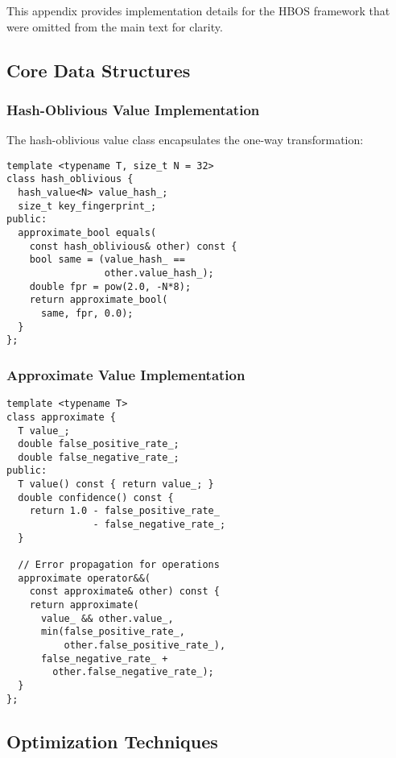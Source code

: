\documentclass[10pt,conference]{IEEEtran}
\begin{document}
This appendix provides implementation details for the HBOS framework that were omitted from the main text for clarity.

\subsection{Core Data Structures}

\subsubsection{Hash-Oblivious Value Implementation}

The hash-oblivious value class encapsulates the one-way transformation:

\begin{lstlisting}[caption={Hash-oblivious value implementation}]
template <typename T, size_t N = 32>
class hash_oblivious {
  hash_value<N> value_hash_;
  size_t key_fingerprint_;
public:
  approximate_bool equals(
    const hash_oblivious& other) const {
    bool same = (value_hash_ ==
                 other.value_hash_);
    double fpr = pow(2.0, -N*8);
    return approximate_bool(
      same, fpr, 0.0);
  }
};
\end{lstlisting}

\subsubsection{Approximate Value Implementation}

\begin{lstlisting}[caption={Approximate value with error tracking}]
template <typename T>
class approximate {
  T value_;
  double false_positive_rate_;
  double false_negative_rate_;
public:
  T value() const { return value_; }
  double confidence() const {
    return 1.0 - false_positive_rate_
               - false_negative_rate_;
  }

  // Error propagation for operations
  approximate operator&&(
    const approximate& other) const {
    return approximate(
      value_ && other.value_,
      min(false_positive_rate_,
          other.false_positive_rate_),
      false_negative_rate_ +
        other.false_negative_rate_);
  }
};
\end{lstlisting}

\subsection{Optimization Techniques}
\end{document}
